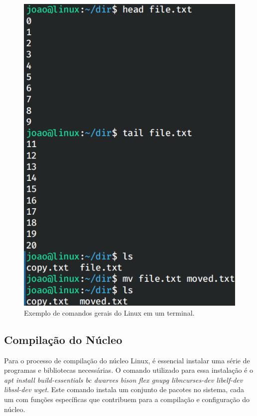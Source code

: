 \documentclass[
	12pt,				%
	oneside,   	        %
	a4paper,			%
	english,			%
	french,				%
	spanish,			%
	brazil,				%
	]{pacotes/abntex2}
\begin{document}
\begin{figure}[H]
  \centering
  \includegraphics[scale=0.5]{figuras/commons2.png}
  \caption{Exemplo de comandos gerais do Linux em um terminal.}
  \label{fig:comandos2}
\end{figure}

\subsection{Compilação do Núcleo}
\label{subsec:compilacao}

Para o processo de compilação do núcleo Linux, é essencial instalar uma série de programas e bibliotecas necessárias. O comando utilizado para essa instalação é  o \textit{apt install build-essentials bc dwarves bison flex gnupg libncurses-dev libelf-dev libssl-dev wget}. Este comando instala um conjunto de pacotes no sistema, cada um com funções específicas que contribuem para a compilação e configuração do núcleo.
\end{document}
